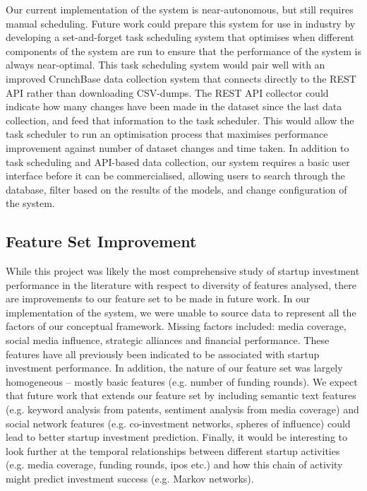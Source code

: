 \documentclass[../thesis/thesis.tex]{subfiles}
\begin{document}
Our current implementation of the system is near-autonomous, but still requires manual scheduling. Future work could prepare this system for use in industry by developing a set-and-forget task scheduling system that optimises when different components of the system are run to ensure that the performance of the system is always near-optimal. This task scheduling system would pair well with an improved CrunchBase data collection system that connects directly to the REST API rather than downloading CSV-dumps. The REST API collector could indicate how many changes have been made in the dataset since the last data collection, and feed that information to the task scheduler. This would allow the task scheduler to run an optimisation process that maximises performance improvement against number of dataset changes and time taken. In addition to task scheduling and API-based data collection, our system requires a basic user interface before it can be commercialised, allowing users to search through the database, filter based on the results of the models, and change configuration of the system.

\subsection{Feature Set Improvement}

While this project was likely the most comprehensive study of startup investment performance in the literature with respect to diversity of features analysed, there are improvements to our feature set to be made in future work. In our implementation of the system, we were unable to source data to represent all the factors of our conceptual framework. Missing factors included: media coverage, social media influence, strategic alliances and financial performance. These features have all previously been indicated to be associated with startup investment performance. In addition, the nature of our feature set was largely homogeneous -- mostly basic features (e.g. number of funding rounds). We expect that future work that extends our feature set by including semantic text features (e.g. keyword analysis from patents, sentiment analysis from media coverage) and social network features (e.g. co-investment networks, spheres of influence) could lead to better startup investment prediction. Finally, it would be interesting to look further at the temporal relationships between different startup activities (e.g. media coverage, funding rounds, \gls{ipo}s etc.) and how this chain of activity might predict investment success (e.g. Markov networks).
\end{document}

